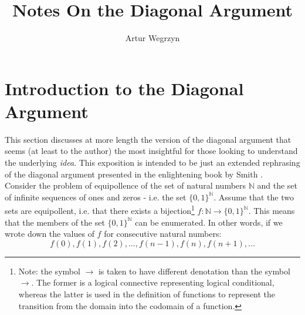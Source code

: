 \documentclass[12pt]{article}
\theoremstyle{plain}
\theoremstyle{definition}
\begin{document}
\title{Notes On the Diagonal Argument}
\author{Artur Wegrzyn}
\maketitle


\tableofcontents

\section{Introduction to the Diagonal Argument}
This section discusses at more length the version of the diagonal argument that seems 
(at least to the author) the most insightful for those looking to understand the 
underlying \textit{idea}. This exposition is intended to be just an extended
rephrasing of the diagonal argument presented in the enlightening book by Smith
\cite{intro_godel_theorems}. \\

Consider the problem of equipollence of the set of natural numbers $\mathbb{N}$
and the set of infinite sequences of ones and zeros -
i.e. the set $\{0, 1 \}^{\mathbb{N}}$. 
Assume that the two sets are equipollent, i.e. that there exists a 
bijection\footnote{Note: the symbol $\rightarrow$ is taken to have different denotation
 than the symbol $\longrightarrow$. The former is a logical connective representing 
 logical conditional, whereas the latter is used in the definition of functions to 
 represent the transition from the domain into the codomain of a function. }
$f: \mathbb{N} \longrightarrow \{0, 1 \}^{\mathbb{N}}$. This means that the members 
of the set $\{ 0, 1 \}^{\mathbb{N}}$ can be enumerated. In other words, if we wrote
 down the values of $f$ for consecutive natural numbers:
\begin{equation}
\label{consecutive_f_values}
f(0), f(1), f(2), ..., f(n-1), f(n), f(n+1), ...
\end{equation}
\end{document}

